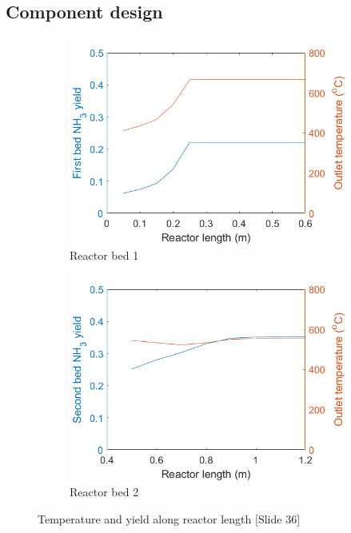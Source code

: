     
        \subsection{Component design}
        
        
    \begin{figure}[H]
        \begin{subfigure}{0.5\textwidth}
            \centering
            \includegraphics[width=1\textwidth]{ammoniasynth/handout/graphics/leng1.png}
            \caption{Reactor bed 1}
            \label{fig:leng1}
        \end{subfigure}%
        \begin{subfigure}{0.5\textwidth}
            \centering
            \includegraphics[width=1\textwidth]{ammoniasynth/handout/graphics/leng2.png}
            \caption{Reactor bed 2}
            \label{fig:leng2}
        \end{subfigure}
        \caption{Temperature and yield along reactor length  [Slide 36]}
    \end{figure}

